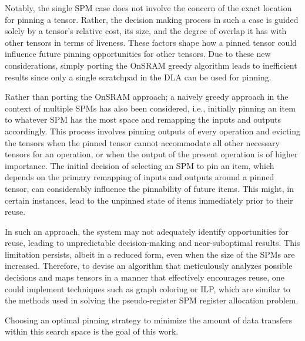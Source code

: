 Notably, the single SPM case does not involve the concern of the exact location for
pinning a tensor. Rather, the decision making process in such a case is guided
solely by a tensor's relative cost, its size, and the degree of overlap it has
with other tensors in terms of liveness. These factors shape how a pinned
tensor could influence future pinning opportunities for other tensors.
Due to these new considerations, simply porting the OnSRAM greedy algorithm 
leads to inefficient results since only a single scratchpad in the DLA can
be used for pinning.

Rather than porting the OnSRAM approach; a naively greedy approach in the
context of multiple SPMs has also been considered, i.e., initially pinning an
item to whatever SPM has the most space and remapping the inputs and outputs
accordingly. This process involves pinning outputs of every operation and
evicting the tensors when the pinned tensor cannot accommodate all other
necessary tensors for an operation, or when the output of the present operation
is of higher importance. The initial decision of selecting an SPM to pin an
item, which depends on the primary remapping of inputs and outputs around a
pinned tensor, can considerably influence the pinnability of future items. This
might, in certain instances, lead to the unpinned state of items immediately
prior to their reuse.

In such an approach, the system may not adequately identify opportunities for
reuse, leading to unpredictable decision-making and near-suboptimal results.
This limitation persists, albeit in a reduced form, even when the size of the
SPMs are increased. Therefore, to devise an algorithm that meticulously analyzes
possible decisions and maps tensors in a manner that effectively encourages
reuse, one could implement techniques such as graph coloring or ILP, which are
similar to the methods used in solving the pseudo-register SPM register
allocation problem.

Choosing an optimal pinning strategy to minimize the amount of data transfers
within this search space is the goal of this work.


